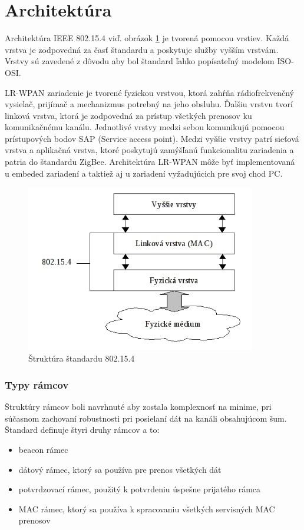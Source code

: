 \documentclass[11pt,twoside,a4paper]{book}
\begin{document}
\section{Architektúra}
Architektúra IEEE 802.15.4 viď. obrázok \ref{fig:802154layers} je tvorená pomocou vrstiev. Každá vrstva je zodpovedná za časť štandardu a poskytuje služby vyšším vrstvám. Vrstvy sú zavedené z dôvodu aby bol štandard ľahko popísateľný modelom ISO-OSI. 

LR-WPAN zariadenie je tvorené fyzickou vrstvou, ktorá zahŕňa rádiofrekvenčný vysielač, prijímač a mechanizmus potrebný na jeho obsluhu. Ďalšiu vrstvu tvorí linková vrstva, ktorá je zodpovedná za prístup všetkých prenosov ku komunikačnému kanálu. Jednotlivé vrstvy medzi sebou komunikujú pomocou prístupových bodov SAP (Service access point). Medzi vyššie vrstvy patrí sieťová vrstva a aplikačná vrstva, ktoré poskytujú zamýšľanú funkcionalitu zariadenia a patria do štandardu ZigBee. Architektúra LR-WPAN môže byť implementovaná u embeded zariadení a taktiež aj u zariadení vyžadujúcich pre svoj chod PC.



\begin{figure}[h]
 \centering
 \includegraphics[width=10cm]{./figures/layers802154.png}
 \caption{Štruktúra štandardu 802.15.4}
 \label{fig:802154layers}
\end{figure}

\subsubsection{Typy rámcov}
Štruktúry rámcov boli navrhnuté aby zostala komplexnosť na minime, pri súčasnom zachovaní robustnosti pri posielaní dát na kanáli obsahujúcom šum.
Štandard definuje štyri druhy rámcov a to:
\begin{itemize}
\item beacon rámec
\item dátový rámec, ktorý sa používa pre prenos všetkých dát
\item potvrdzovací rámec, použitý k potvrdeniu úspešne prijatého rámca
\item MAC rámec, ktorý sa používa k spracovaniu všetkých servisných MAC prenosov
\end{itemize}
\end{document}
